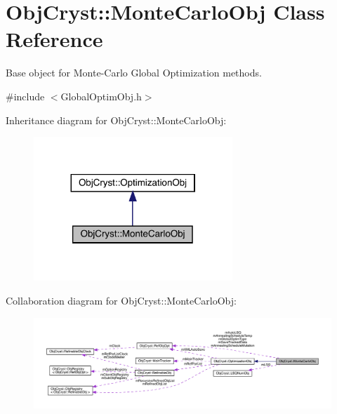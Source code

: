 \hypertarget{class_obj_cryst_1_1_monte_carlo_obj}{}\section{Obj\+Cryst\+::Monte\+Carlo\+Obj Class Reference}
\label{class_obj_cryst_1_1_monte_carlo_obj}


Base object for Monte-\/\+Carlo Global Optimization methods.  




{\ttfamily \#include $<$Global\+Optim\+Obj.\+h$>$}



Inheritance diagram for Obj\+Cryst\+::Monte\+Carlo\+Obj\+:
\nopagebreak
\begin{figure}[H]
\begin{center}
\leavevmode
\includegraphics[width=212pt]{class_obj_cryst_1_1_monte_carlo_obj__inherit__graph}
\end{center}
\end{figure}


Collaboration diagram for Obj\+Cryst\+::Monte\+Carlo\+Obj\+:
\nopagebreak
\begin{figure}[H]
\begin{center}
\leavevmode
\includegraphics[width=350pt]{class_obj_cryst_1_1_monte_carlo_obj__coll__graph}
\end{center}
\end{figure}
